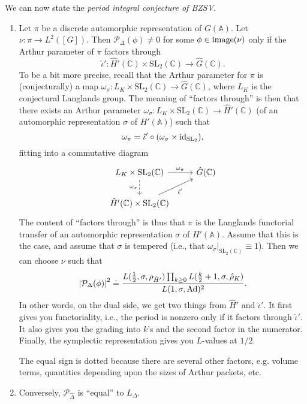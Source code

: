 \documentclass[reqno]{amsart} 
\numberwithin{theorem}{section}
\numberwithin{equation}{section}
\numberwithin{exercise}{section}
\begin{document}
We can now state the \emph{period integral conjecture of BZSV}.
\begin{enumerate}
\item Let $\pi$ be a discrete automorphic representation of $G(\mathbb{A})$.  Let $\nu : \pi \rightarrow L^2([G])$.  Then $\mathcal{P}_\Delta(\phi) \neq 0$ for some $\phi \in \operatorname{image}(\nu)$ only if the Arthur parameter of $\pi$ factors through
  \begin{equation*}
    \hat{\iota}' : \hat{H}'(\mathbb{C}) \times \mathrm{SL}_2(\mathbb{C}) \rightarrow \hat{G}(\mathbb{C}).
  \end{equation*}
  To be a bit more precise, recall that the Arthur parameter for $\pi$ is (conjecturally) a map $\omega_\pi : L_K \times \mathrm{SL}_2(\mathbb{C}) \rightarrow \hat{G}(\mathbb{C})$, where $L_K$ is the conjectural Langlands group.  The meaning of ``factors through'' is then that there exists an Arthur parameter $\omega_\sigma : L_K \times \mathrm{SL}_2(\mathbb{C}) \rightarrow \hat{H}'(\mathbb{C})$ (of an automorphic representation $\sigma$ of $H '(\mathbb{A})$) such that
  \begin{equation*}
    \omega_\pi = \hat{\iota} ' \circ (\omega_\sigma \times \operatorname{id}_{\operatorname{SL}_2}),
  \end{equation*}
  fitting into a commutative diagram
  \begin{equation*}
    \begin{tikzcd}
      L_K \times \mathrm{SL}_2(\mathbb{C}) \arrow[r, "\omega_\pi"] \arrow[d, "\omega_\sigma"', dashed] & \hat{G}(\mathbb{C}) \\
      \hat{H}'(\mathbb{C}) \times \mathrm{SL}_2(\mathbb{C}) \arrow[ur, "\hat{\iota}'"'] &
    \end{tikzcd}
  \end{equation*}
  The content of ``factors through'' is thus that $\pi$ is the Langlands functorial transfer of an automorphic representation $\sigma$ of $H '(\mathbb{A})$.  Assume that this is the case, and assume that $\sigma$ is tempered (i.e., that $\omega_\sigma |_{\mathrm{SL}_2(\mathbb{C})} \equiv 1$).  Then we can choose $\nu$ such that
  \begin{equation*}
    \left\lvert \mathcal{P}_\Delta(\phi) \right\rvert^2
    \doteq
    \frac{
      L(\tfrac{1}{2}, \sigma, \rho_{\hat{H}'})
      \prod_{k \geq 0} L(\frac{k}{2} + 1, \sigma, \hat{\rho}_K)}{L(1, \sigma, \operatorname{Ad})^2}.
  \end{equation*}
  In other words, on the dual side, we get two things from $\hat{H}'$ and $\hat{\iota}'$.  It first gives you functoriality, i.e., the period is nonzero only if it factors through $\hat{\iota}'$.  It also gives you the grading into $k$'s and the second factor in the numerator.  Finally, the symplectic representation gives you $L$-values at $1/2$.

  The equal sign is dotted because there are several other factors, e.g. volume terms, quantities depending upon the sizes of Arthur packets, etc.
\item Conversely, $\mathcal{P}_{\hat{\Delta}}$ is ``equal'' to $L_\Delta$.
\end{enumerate}
\end{document}
